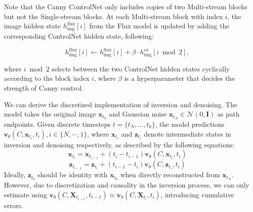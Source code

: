 \documentclass{article}
\begin{document}
Note that the Canny ControlNet only includes copies of two Multi-stream blocks but not the Single-stream blocks. At each Multi-stream block with index \( i \), the image hidden state \( h^{\text{flux}}_{\text{img}}[i] \) from the Flux model is updated by adding the corresponding ControlNet hidden state, following:

\[
h^{\text{flux}}_{\text{img}}[i] \leftarrow h^{\text{flux}}_{\text{img}}[i] + \beta\cdot h^{ca}_{\text{img}}[i \bmod 2],
\]

where \( i \bmod 2 \) selects between the two ControlNet hidden states cyclically according to the block index \( i \), where $\beta$ is a hyperparameter that decides the strength of Canny control.







We can derive the discretized implementation of inversion and denoising. The model takes the original image $\mathbf{x}_{t_0}$ and Gaussian noise $\mathbf{x}_{t_N}\in\mathcal{N}(0,\boldsymbol{I})$ as path endpoints. Given discrete timesteps $t=\{t_{N},...,t_{0}\}$, the model predictions $\boldsymbol{v}_\theta(C,\mathbf{x}_{t_i},t_i),i\in\{N,\cdots,1\}$, where $\mathbf{x}_{t_i}$ and $\mathbf{z}_{t_i}$ denote intermediate states in inversion and denoising respectively, as described by the following equations:
\begin{equation}
\mathbf{x}_{t_{i}}=\mathbf{x}_{t_{i-1}}+(t_i-t_{i-1})\boldsymbol{v}_\theta(C,\mathbf{x}_{t_i},t_i)
\end{equation}
\begin{equation}
\mathbf{z}_{t_{i-1}}=\mathbf{z}_{t_i}+(t_{i-1}-t_i)\boldsymbol{v}_\theta(C,\mathbf{z}_{t_i},t_i) 
\end{equation}
Ideally, $\mathbf{z}_{t_0}$ should be identity with $\mathbf{x}_{t_0}$ when directly reconstructed from $\mathbf{x}_{t_N}$. However, due to discretization and causality in the inversion process, we can only estimate using $\boldsymbol{v}_\theta(C,\mathbf{X}_{t_{t-1}},t_{t-1}) \approx \boldsymbol{v}_\theta(C,\mathbf{X}_{t_i},t_i)$, introducing cumulative errors. 

\end{document}
